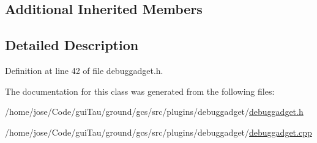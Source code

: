 \subsection*{Additional Inherited Members}


\subsection{Detailed Description}


Definition at line 42 of file debuggadget.\-h.



The documentation for this class was generated from the following files\-:\begin{DoxyCompactItemize}
\item 
/home/jose/\-Code/gui\-Tau/ground/gcs/src/plugins/debuggadget/\hyperlink{debuggadget_8h}{debuggadget.\-h}\item 
/home/jose/\-Code/gui\-Tau/ground/gcs/src/plugins/debuggadget/\hyperlink{debuggadget_8cpp}{debuggadget.\-cpp}\end{DoxyCompactItemize}
